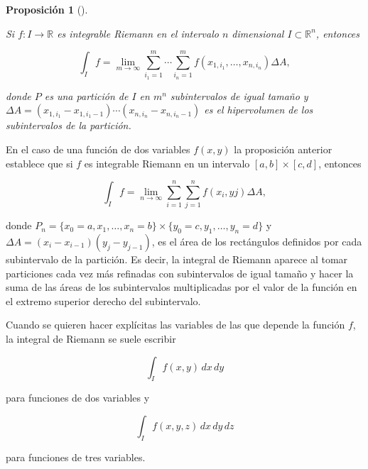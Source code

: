 \documentclass[
  a4paper,
]{scrreport}
\theoremstyle{definition}
\theoremstyle{definition}
\theoremstyle{definition}
\theoremstyle{plain}
\theoremstyle{plain}
\theoremstyle{plain}
\newtheorem{proposition}{Proposición}[chapter]
\theoremstyle{remark}
\begin{document}
\begin{proposition}[]\protect\hypertarget{prp-integral-riemann-n-dimensional}{}\label{prp-integral-riemann-n-dimensional}

Si \(f:I\to \mathbb{R}\) es integrable Riemann en el intervalo \(n\)
dimensional \(I\subset \mathbb{R}^n\), entonces

\[
\int_I f = \lim_{m\to \infty} \sum_{i_1=1}^m\cdots \sum_{i_n=1}^m f(x_{1,i_1},\ldots, x_{n,i_n})\Delta A,
\]

donde \(P\) es una partición de \(I\) en \(m^n\) subintervalos de igual
tamaño y
\(\Delta A = (x_{1,i_1}-x_{1,i_1-1})\cdots (x_{n,i_n}-x_{n,i_n-1})\) es
el hipervolumen de los subintervalos de la partición.

\end{proposition}

En el caso de una función de dos variables \(f(x,y)\) la proposición
anterior establece que si \(f\) es integrable Riemann en un intervalo
\([a,b]\times [c,d]\), entonces

\[
\int_I f = \lim_{n\to \infty}\sum_{i=1}^n\sum_{j=1}^n f(x_i, yj)\Delta A,
\]

donde
\(P_n = \{x_0=a,x_1,\ldots,x_n=b\}\times \{y_0=c,y_1,\ldots,y_n=d\}\) y
\(\Delta A = (x_i-x_{i-1})(y_j-y_{j-1})\), es el área de los rectángulos
definidos por cada subintervalo de la partición. Es decir, la integral
de Riemann aparece al tomar particiones cada vez más refinadas con
subintervalos de igual tamaño y hacer la suma de las áreas de los
subintervalos multiplicadas por el valor de la función en el extremo
superior derecho del subintervalo.

\begin{tcolorbox}[enhanced jigsaw, bottomtitle=1mm, title=\textcolor{quarto-callout-note-color}{\faInfo}\hspace{0.5em}{Nota}, colbacktitle=quarto-callout-note-color!10!white, coltitle=black, leftrule=.75mm, colback=white, toptitle=1mm, toprule=.15mm, titlerule=0mm, opacitybacktitle=0.6, colframe=quarto-callout-note-color-frame, bottomrule=.15mm, arc=.35mm, rightrule=.15mm, breakable, left=2mm, opacityback=0]

Cuando se quieren hacer explícitas las variables de las que depende la
función \(f\), la integral de Riemann se suele escribir

\[
\int_{I} f(x,y) \,dx\,dy
\]

para funciones de dos variables y

\[
\int_{I} f(x,y,z) \,dx\,dy\,dz 
\]

para funciones de tres variables.

\end{tcolorbox}
\end{document}
